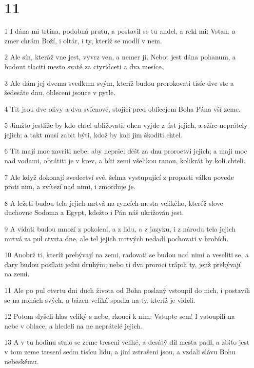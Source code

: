 \chapter{11}

\par 1 I dána mi trtina, podobná prutu, a postavil se tu andel, a rekl mi: Vstan, a zmer chrám Boží, i oltár, i ty, kteríž se modlí v nem.
\par 2 Ale sín, kteráž vne jest, vyvrz ven, a nemer jí. Nebot jest dána pohanum, a budout tlaciti mesto svaté za ctyridceti a dva mesíce.
\par 3 Ale dám jej dvema svedkum svým, kteríž budou prorokovati tisíc dve ste a šedesáte dnu, obleceni jsouce v pytle.
\par 4 Tit jsou dve olivy a dva svícnové, stojící pred oblicejem Boha Pána vší zeme.
\par 5 Jimžto jestliže by kdo chtel ubližovati, ohen vyjde z úst jejich, a sžíre neprátely jejich; a takt musí zabit býti, kdož by koli jim škoditi chtel.
\par 6 Tit mají moc zavríti nebe, aby nepršel déšt za dnu proroctví jejich; a mají moc nad vodami, obrátiti je v krev, a bíti zemi všelikou ranou, kolikrát by koli chteli.
\par 7 Ale když dokonají svedectví své, šelma vystupující z propasti válku povede proti nim, a zvítezí nad nimi, i zmorduje je.
\par 8 A ležeti budou tela jejich mrtvá na ryncích mesta velikého, kteréž slove duchovne Sodoma a Egypt, kdežto i Pán náš ukrižován jest.
\par 9 A vídati budou mnozí z pokolení, a z lidu, a z jazyku, i z národu tela jejich mrtvá za pul ctvrta dne, ale tel jejich mrtvých nedadí pochovati v hrobích.
\par 10 Anobrž ti, kteríž prebývají na zemi, radovati se budou nad nimi a veseliti se, a dary budou posílati jedni druhým; nebo ti dva proroci trápili ty, jenž prebývají na zemi.
\par 11 Ale po pul ctvrtu dni duch života od Boha poslaný vstoupil do nich, i postavili se na nohách svých, a bázen veliká spadla na ty, kteríž je videli.
\par 12 Potom slyšeli hlas veliký s nebe, rkoucí k nim: Vstupte sem! I vstoupili na nebe v oblace, a hledeli na ne neprátelé jejich.
\par 13 A v tu hodinu stalo se zeme tresení veliké, a desátý díl mesta padl, a zbito jest v tom zeme tresení sedm tisícu lidu, a jiní zstrašeni jsou, a vzdali slávu Bohu nebeskému.

